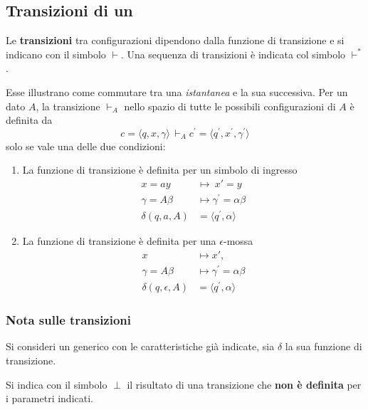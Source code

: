 \documentclass[italian, 10pt]{article}
\begin{document}
\subsection{Transizioni di un \PDA}

Le \textbf{transizioni} tra configurazioni dipendono dalla funzione di transizione e si indicano con il simbolo \(\vdash\).
Una sequenza di transizioni è indicata col simbolo \(\vdash^\ast\).

Esse illustrano come commutare tra una \textit{istantanea} e la sua successiva.
Per un dato \PDA \(A\), la transizione \(\vdash_A\) nello spazio di tutte le possibili configurazioni di \(A\) è definita da
\[ c = \langle q, x, \gamma \rangle \, \vdash_A c^\prime  = \langle q^\prime , x^\prime , \gamma^\prime  \rangle \]
solo se vale una delle due condizioni:

\begin{enumerate}
  \item La funzione di transizione è definita per un simbolo di ingresso
        \begin{align*}
          x = ay           & \mapsto \ x{'} = y                    \\
          \gamma = A \beta & \mapsto \gamma^\prime  = \alpha \beta \\
          \delta(q, a, A)  & =  \langle q^\prime , \alpha \rangle
        \end{align*}
  \item La funzione di transizione è definita per una \(\epsilon\)-mossa
        \begin{align*}
          x                      & \mapsto x{'},                         \\
          \gamma       = A \beta & \mapsto \gamma^\prime  = \alpha \beta \\
          \delta(q, \epsilon, A) & = \langle q^\prime , \alpha \rangle
        \end{align*}
\end{enumerate}

\subsubsection{Nota sulle transizioni}

Si consideri un generico \PDA con le caratteristiche già indicate, sia \(\delta\) la sua funzione di transizione.

Si indica con il simbolo \(\perp\) il risultato di una transizione che
\textbf{non è definita} per i parametri indicati.
\end{document}

